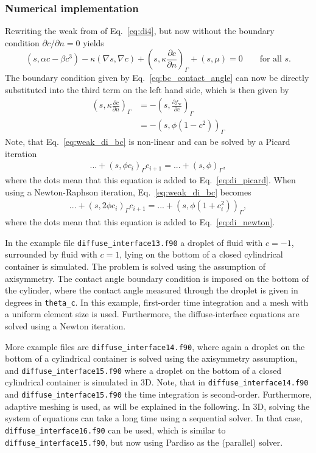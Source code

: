 \subsubsection{Numerical implementation}
Rewriting the weak from of Eq.~\eqref{eq:di4}, but now without the boundary 
condition $\partial c / \partial n = 0$ yields
\begin{equation}
  (s, \alpha c-\beta c^3) -   \kappa(\nabla s,\nabla c) + ( s, \kappa
  \frac{\partial c}{\partial n})_{\Gamma}
  +(s,\mu) =0 \qquad\text{for all } s.
\end{equation}
The boundary condition given by Eq.~\eqref{eq:bc_contact_angle} can now
be directly substituted into the third term on the left hand side, which is 
then given by
\begin{align}
  ( s, \kappa  \frac{\partial c}{\partial  n} )_{\Gamma} 
  &= -( s, \frac{\partial f_\text{w}}{\partial c} )_{\Gamma} \\
  &= -\left( s, \phi (1-c^2) \right)_{\Gamma} \label{eq:weak_di_bc}
\end{align}
Note, that Eq.~\eqref{eq:weak_di_bc} is non-linear and can be solved by 
a Picard iteration
\begin{align}
 ...+\left(s,\phi c_i\right)_{\Gamma}c_{i+1} = 
 ...+\left(s,\phi\right)_{\Gamma},
\end{align}
where the dots mean that this equation is added to Eq.~\eqref{eq:di_picard}. 
When using a Newton-Raphson iteration, Eq.~\eqref{eq:weak_di_bc} becomes
\begin{align}
 ...+\left(s,2\phi c_i\right)_{\Gamma}c_{i+1} = 
 ...+\left(s,\phi(1+c_i^2)\right)_{\Gamma},
\end{align}
where the dots mean that this equation is added to Eq.~\eqref{eq:di_newton}.

In the example file \texttt{diffuse\_interface13.f90} a droplet of fluid 
with $c=-1$, surrounded by fluid with $c=1$, lying on the bottom of a closed 
cylindrical 
container is simulated. The problem is solved using the assumption of 
axisymmetry.
The contact angle boundary condition is imposed on the bottom of the cylinder, 
where the contact angle measured through the droplet is given in 
degrees in \texttt{theta\_c}. In this example, first-order time integration and 
a mesh with a uniform element size is used. Furthermore, the diffuse-interface  
equations are solved using a Newton iteration.

More example files are \texttt{diffuse\_interface14.f90}, where again a droplet 
on the bottom of a cylindrical container is solved using the axisymmetry 
assumption, and \texttt{diffuse\_interface15.f90} where a droplet on the bottom 
of a closed cylindrical container is simulated in 3D. Note, that in 
\texttt{diffuse\_interface14.f90} and \texttt{diffuse\_interface15.f90} the 
time integration is second-order. Furthermore, adaptive meshing is used, as 
will be explained in the following. In 3D, solving the system of equations 
can take a long time using a sequential solver. In that case, 
\texttt{diffuse\_interface16.f90} can be used, which is similar to 
\texttt{diffuse\_interface15.f90}, but now using Pardiso as the (parallel) 
solver.

